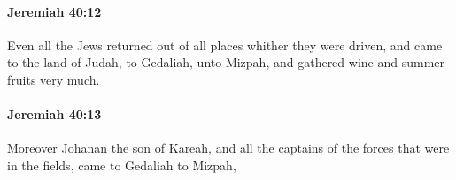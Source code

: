 		\paragraph{Jeremiah 40:12} %
			\label{JEREMIAH-40-12}

			Even all the Jews returned out of all places whither they were driven, and came to the land of Judah, to Gedaliah, unto Mizpah, and gathered wine and summer fruits very much.


		\paragraph{Jeremiah 40:13} %
			\label{JEREMIAH-40-13}

			Moreover Johanan the son of Kareah, and all the captains of the forces that were in the fields, came to Gedaliah to Mizpah,


